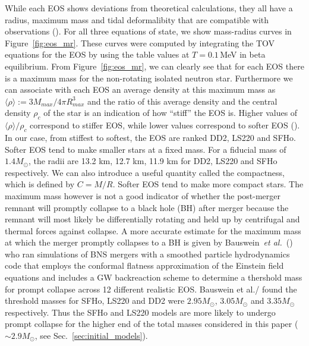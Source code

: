 While each EOS shows deviations from theoretical calculations, they all have a radius, maximum mass and tidal deformalibity that are compatible with observations (\cite{demorest:2010bx,hempel2017well}). For all three equations of state, we show mass-radius curves in Figure~\ref{fig:eos_mr}. These curves were computed by integrating the TOV equations for the EOS by using the table values at $T=0.1$\,MeV in beta equilibrium. From Figure~\ref{fig:eos_mr}, we can clearly see that for each EOS there is a maximum mass for the non-rotating isolated neutron star. Furthermore we can associate with each EOS an average density at this maximum mass as $\langle \rho \rangle := 3M_{max}/4\pi R^3_{max}$ and the ratio of this average density and the central density $\rho_c$ of the star is an indication of how ``stiff'' the EOS is. Higher values of $\langle \rho \rangle/\rho_c$ correspond to stiffer EOS, while lower values correspond to softer EOS (\cite{bauswein2013prompt}). In our case, from stiffest to softest, the EOS are ranked DD2, LS220 and SFHo. Softer EOS tend to make smaller stars at a fixed mass. For a fiducial mass of $1.4M_\odot$, the radii are 13.2 km, 12.7 km, 11.9 km for DD2, LS220 and SFHo respectively. We can also introduce a useful quantity called the compactness, which is defined by $C=M/R$. Softer EOS tend to make more compact stars. The maximum mass however is not a good indicator of whether the post-merger remnant will promptly collapse to a black hole (BH) after merger because the remnant will most likely be differentially rotating and held up by centrifugal and thermal forces against collapse.
A more accurate estimate for the maximum mass at which the merger promptly collapses to a BH is given by Bauswein~{\it et al.}~(\cite{bauswein2013prompt}) who ran simulations of BNS mergers with a smoothed particle hydrodynamics code that employs the conformal flatness approximation of the Einstein field equations and includes a GW backreaction scheme to determine a thershold mass for prompt collapse across 12 different realistic EOS. Bauswein et al./ found the threshold masses for SFHo, LS220 and DD2 were $2.95M_\odot$, $3.05M_\odot$ and $3.35M_\odot$ respectively. Thus the SFHo and LS220 models are more likely to undergo prompt collapse for the higher end of the total masses considered in this paper ($\sim 2.9M_\odot$, see Sec.~\ref{sec:initial_models}). 


